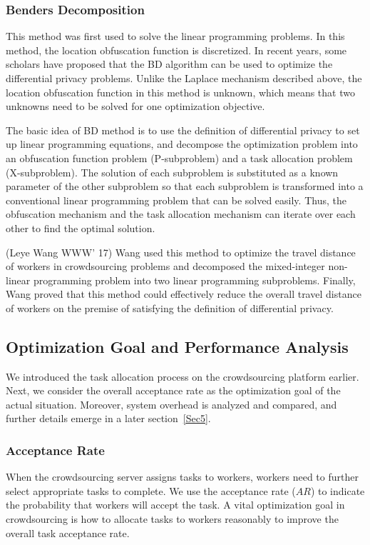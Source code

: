 \subsubsection{Benders Decomposition}
This method was first used to solve the linear programming problems. In this method, the location obfuscation function is discretized. In recent years, some scholars have proposed that the BD algorithm can be used to optimize the differential privacy problems. Unlike the Laplace mechanism described above, the location obfuscation function in this method is unknown, which means that two unknowns need to be solved for one optimization objective.

The basic idea of BD method is to use the definition of differential privacy to set up linear programming equations, and decompose the optimization problem into an obfuscation function problem (P-subproblem) and a task allocation problem (X-subproblem). The solution of each subproblem is substituted as a known parameter of the other subproblem so that each subproblem is transformed into a conventional linear programming problem that can be solved easily. Thus, the obfuscation mechanism and the task allocation mechanism can iterate over each other to find the optimal solution.

(Leye Wang WWW' 17) Wang used this method to optimize the travel distance of workers in crowdsourcing problems and decomposed the mixed-integer non-linear programming problem into two linear programming subproblems. Finally, Wang proved that this method could effectively reduce the overall travel distance of workers on the premise of satisfying the definition of differential privacy.

\subsection{Optimization Goal and Performance Analysis} %
We introduced the task allocation process on the crowdsourcing platform earlier. Next, we consider the overall acceptance rate as the optimization goal of the actual situation. Moreover, system overhead is analyzed and compared, and further details emerge in a later section~\ref{Sec5}.

\subsubsection{Acceptance Rate}
When the crowdsourcing server assigns tasks to workers, workers need to further select appropriate tasks to complete. We use the acceptance rate ($AR$) to indicate the probability that workers will accept the task. A vital optimization goal in crowdsourcing is how to allocate tasks to workers reasonably to improve the overall task acceptance rate.

